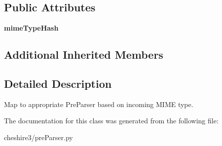\subsection*{Public Attributes}
\begin{DoxyCompactItemize}
\item 
\hypertarget{classcheshire3_1_1pre_parser_1_1_magic_redirect_pre_parser_aa9860c155a35007e88219f75c872c3ea}{{\bfseries mime\-Type\-Hash}}\label{classcheshire3_1_1pre_parser_1_1_magic_redirect_pre_parser_aa9860c155a35007e88219f75c872c3ea}

\end{DoxyCompactItemize}
\subsection*{Additional Inherited Members}


\subsection{Detailed Description}
\begin{DoxyVerb}Map to appropriate PreParser based on incoming MIME type.\end{DoxyVerb}
 

The documentation for this class was generated from the following file\-:\begin{DoxyCompactItemize}
\item 
cheshire3/pre\-Parser.\-py\end{DoxyCompactItemize}
